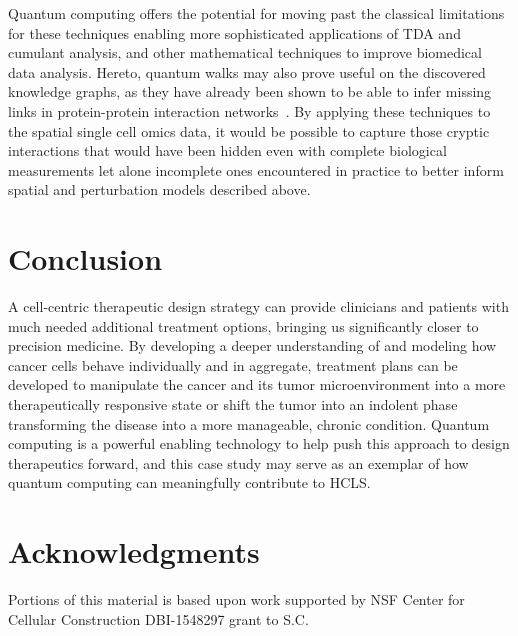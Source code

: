 \documentclass{article}
\begin{document}
Quantum computing offers the potential for moving past the classical limitations for these techniques enabling more sophisticated applications of TDA and cumulant analysis, and other mathematical techniques to improve biomedical data analysis.  Hereto, quantum walks may also prove useful on the discovered knowledge graphs, as they have already been shown to be able to infer missing links in protein-protein interaction networks~\cite{Goldsmith2023}. By applying these techniques to the spatial single cell omics data, it would be possible to capture those cryptic interactions that would have been hidden even with complete biological measurements let alone incomplete ones encountered in practice to better inform spatial and perturbation models described above.

\section{Conclusion}
A cell-centric therapeutic design strategy can provide clinicians and patients with much needed additional treatment options, bringing us significantly closer to precision medicine. By developing a deeper understanding of and modeling how cancer cells behave individually and in aggregate, treatment plans can be developed to manipulate the cancer and its tumor microenvironment into a more therapeutically responsive state or shift the tumor into an indolent phase transforming the disease into a more manageable, chronic condition. Quantum computing is a powerful enabling technology to help push this approach to design therapeutics forward, and this case study may serve as an exemplar of how quantum computing can meaningfully contribute to HCLS.

\section{Acknowledgments}
Portions of this material is based upon work supported by NSF Center for Cellular Construction DBI-1548297 grant to S.C.



\end{document}
